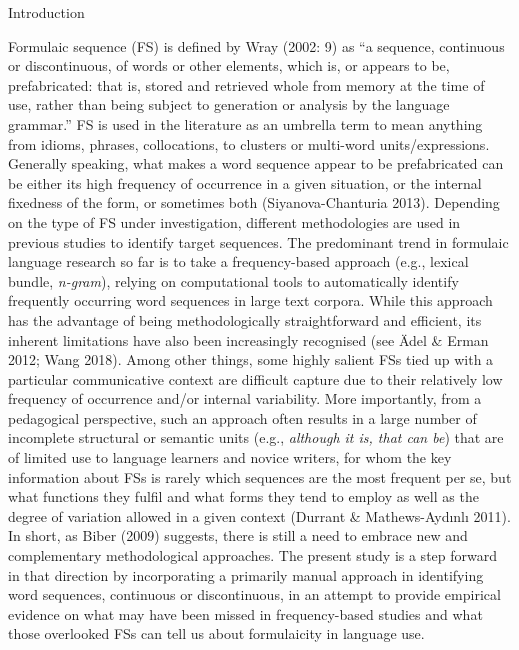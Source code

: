 \setcounter{listWWNumxivleveli}{0}
\begin{listWWNumxivleveli}
\item 
\begin{stylelsSectioni}
Introduction
\end{stylelsSectioni}
\end{listWWNumxivleveli}
\begin{styleStandard}
Formulaic sequence (FS) is defined by Wray (2002: 9) as “a sequence, continuous or discontinuous, of words or other elements, which is, or appears to be, prefabricated: that is, stored and retrieved whole from memory at the time of use, rather than being subject to generation or analysis by the language grammar.” FS is used in the literature as an umbrella term to mean anything from idioms, phrases, collocations, to clusters or multi-word units/expressions. Generally speaking, what makes a word sequence appear to be prefabricated can be either its high frequency of occurrence in a given situation, or the internal fixedness of the form, or sometimes both (Siyanova-Chanturia 2013). Depending on the type of FS under investigation, different methodologies are used in previous studies to identify target sequences. The predominant trend in formulaic language research so far is to take a frequency-based approach (e.g., lexical bundle, \textit{n-gram}), relying on computational tools to automatically identify frequently occurring word sequences in large text corpora. While this approach has the advantage of being methodologically straightforward and efficient, its inherent limitations have also been increasingly recognised (see Ädel \& Erman 2012; Wang 2018). Among other things, some highly salient FSs tied up with a particular communicative context are difficult capture due to their relatively low frequency of occurrence and/or internal variability. More importantly, from a pedagogical perspective, such an approach often results in a large number of incomplete structural or semantic units (e.g., \textit{although it is, that can be}) that are of limited use to language learners and novice writers, for whom the key information about FSs is rarely which sequences are the most frequent per se, but what functions they fulfil and what forms they tend to employ as well as the degree of variation allowed in a given context (Durrant \& Mathews-Aydınlı 2011). In short, as Biber (2009) suggests, there is still a need to embrace new and complementary methodological approaches. The present study is a step forward in that direction by incorporating a primarily manual approach in identifying word sequences, continuous or discontinuous, in an attempt to provide empirical evidence on what may have been missed in frequency-based studies and what those overlooked FSs can tell us about formulaicity in language use. 
\end{styleStandard}

